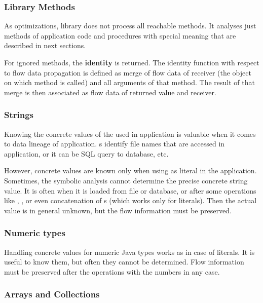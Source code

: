 \subsubsection{Library Methods}

As optimizations, library does not process all reachable methods.
It analyses just methods of application code and procedures with special
meaning that are described in next sections.

For ignored methods, the \textbf{identity} is returned.
The identity function with respect to flow data propagation is defined as
merge of flow data of receiver (the object on which method is called) and
all arguments of that method. The result of that merge is then associated
as flow data of returned value and receiver.




\subsubsection{Strings}

Knowing the concrete values of the  used in application is valuable
when it comes to data lineage of application.
s identify file names that are accessed in application,
or it can be SQL query to database, etc.

However, concrete values are known only when using as literal in the application.
Sometimes, the symbolic analysis cannot determine the precise concrete string value.
It is often when it is loaded from file or database, or after some operations
like , , or even concatenation of s
(which works only for  literals).
Then the actual value is in general unknown, but the flow information must be preserved.




\subsubsection{Numeric types}

Handling concrete values for numeric Java types works as in case
of  literals. It is useful to know them, but often
they cannot be determined. Flow information must be preserved after
the operations with the numbers in any case.




\subsubsection{Arrays and Collections}

